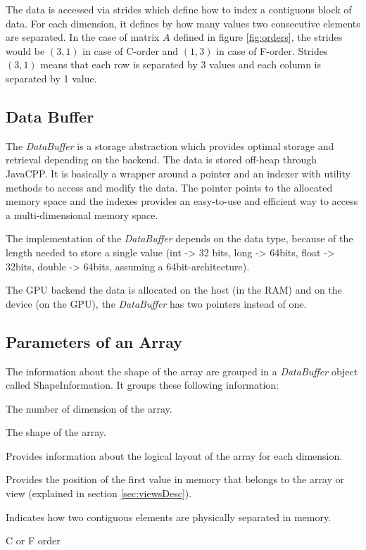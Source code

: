 The data is accessed via strides which define how to index a contiguous block of data. For each dimension, it defines by how many values two consecutive elements are separated. In the case of matrix $A$ defined in figure \ref{fig:orders}, the strides would be $(3, 1)$ in case of C-order and $(1, 3)$ in case of F-order. Strides $(3, 1)$ means that each row is separated by 3 values and each column is separated by 1 value.

\subsection{Data Buffer}
The \textit{DataBuffer} is a storage abstraction which provides optimal storage and retrieval depending on the backend. The data is stored off-heap through JavaCPP. It is basically a wrapper around a pointer and an indexer with utility methods to access and modify the data. 
The pointer points to the allocated memory space and the indexes provides an easy-to-use and efficient way to access a multi-dimensional memory space.

The implementation of the \textit{DataBuffer} depends on the data type, because of the length needed to store a single value (int -> 32 bits, long -> 64bits, float -> 32bits, double -> 64bits, assuming a 64bit-architecture).

The GPU backend the data is allocated on the host (in the RAM) and on the device (on the GPU), the \textit{DataBuffer} has two pointers instead of one.

\subsection{Parameters of an Array}
The information about the shape of the array are grouped in a \textit{DataBuffer} object called ShapeInformation. It groups these following information:

\begin{description}[leftmargin=!,labelwidth=\widthof{\bfseries ElementWiseStride}]
	\item [Rank] The number of dimension of the array.
	\item [Shape] The shape of the array.
	\item [Strides] Provides information about the logical layout of the array for each dimension.
	\item [Offset] Provides the position of the first value in memory that belongs to the array or view (explained in section \ref{sec:viewsDesc}).
	\item [ElementWiseStride] Indicates how two contiguous elements are physically separated in memory.
	\item[Order] C or F order
\end{description}


